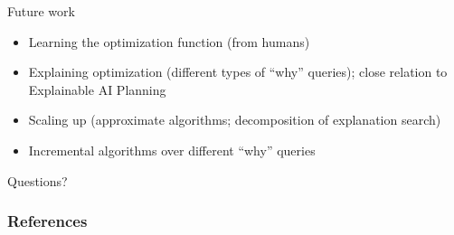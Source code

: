 \documentclass{beamer}
\begin{document}
		
		\begin{frame}{Future work}
			
			\begin{itemize}
				\item[$\triangleright$] Learning the optimization function (from humans)
				\item[$\triangleright$] Explaining optimization (different types of ``why'' queries); close relation to Explainable AI Planning \cite{fox2017explainable}
				\item[$\triangleright$] Scaling up (approximate algorithms; decomposition of explanation search)
				\item[$\triangleright$] Incremental algorithms over different ``why'' queries
			\end{itemize}	
			
			
		\end{frame}
		
		
		\begin{frame}
			\begin{center}
				{\huge Questions?}
			\end{center}		
		\end{frame}
		
		
		\begin{frame}[allowframebreaks]
			\frametitle{References}
			
			
		\end{frame}
		
		
		
	
\end{document}
